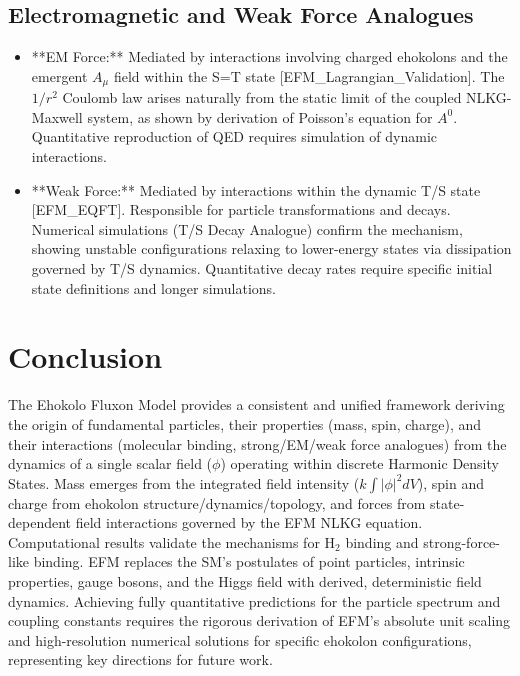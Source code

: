 \documentclass[11pt]{article}
\begin{document}
\subsection{Electromagnetic and Weak Force Analogues}
\begin{itemize}
    \item **EM Force:** Mediated by interactions involving charged ehokolons and the emergent \(A_\mu\) field within the S=T state [EFM\_Lagrangian\_Validation]. The \(1/r^2\) Coulomb law arises naturally from the static limit of the coupled NLKG-Maxwell system, as shown by derivation of Poisson's equation for \(A^0\). Quantitative reproduction of QED requires simulation of dynamic interactions.
    \item **Weak Force:** Mediated by interactions within the dynamic T/S state [EFM\_EQFT]. Responsible for particle transformations and decays. Numerical simulations (T/S Decay Analogue) confirm the mechanism, showing unstable configurations relaxing to lower-energy states via dissipation governed by T/S dynamics. Quantitative decay rates require specific initial state definitions and longer simulations.
\end{itemize}

\section{Conclusion}
The Ehokolo Fluxon Model provides a consistent and unified framework deriving the origin of fundamental particles, their properties (mass, spin, charge), and their interactions (molecular binding, strong/EM/weak force analogues) from the dynamics of a single scalar field (\(\phi\)) operating within discrete Harmonic Density States. Mass emerges from the integrated field intensity (\(k\int |\phi|^2 dV\)), spin and charge from ehokolon structure/dynamics/topology, and forces from state-dependent field interactions governed by the EFM NLKG equation. Computational results validate the mechanisms for H\(_2\) binding and strong-force-like binding. EFM replaces the SM's postulates of point particles, intrinsic properties, gauge bosons, and the Higgs field with derived, deterministic field dynamics. Achieving fully quantitative predictions for the particle spectrum and coupling constants requires the rigorous derivation of EFM's absolute unit scaling and high-resolution numerical solutions for specific ehokolon configurations, representing key directions for future work.
\end{document}
